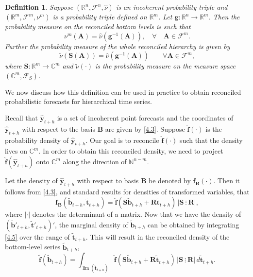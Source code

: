 \documentclass[a4paper, 11pt]{article}
\newtheorem{definition}{Definition}[section]
\begin{document}
\begin{definition} \label{def:reconprob}
  Suppose $(\mathbb{R}^n, \mathscr{F}^n, \hat{\nu})$ is an incoherent probability triple and $(\mathbb{R}^m, \mathscr{F}^m, \nu^m)$ is a probability triple defined on $\mathbb{R}^m$. Let $\bm{g}:\mathbb{R}^n \rightarrow \mathbb{R}^m $. Then the probability measure on the reconciled bottom levels is such that
  \begin{equation}
  \nu^m(\bm{A}) = \hat{\nu}(\bm{g}^{-1}(\bm{A})), \quad \forall \quad \bm{A} \in \mathscr{F}^m.
  \end{equation}
  Further the probability measure of the whole reconciled hierarchy is given by
  \begin{equation}
  \tilde{\nu}(\bm{S}(\bm{A})) = \hat{\nu}(\bm{g}^{-1}(\bm{A})) \qquad \forall \bm{A} \in \mathscr{F}^m,
  \end{equation}
  where $\bm{S}:\mathbb{R}^m \rightarrow \mathbb{C}^m$ and $\tilde{\nu}(\cdot)$ is the probability measure on the measure space $(\mathbb{C}^m, \mathscr{F}_S)$.
\end{definition}

We now discuss how this definition can be used in practice to obtain reconciled probabilistic forecasts for hierarchical time series.

Recall that $\hat{\bm{y}}_{t+h}$ is a set of incoherent point forecasts and the coordinates of $\hat{\bm{y}}_{t+h}$ with respect to the basis $\bm{B}$ are given by \eqref{4.3}. Suppose $\hat{\bm{f}}(\cdot)$ is the probability density of $\hat{\bm{y}}_{t+h}$. Our goal is to reconcile $\hat{\bm{f}}(\cdot)$ such that the density lives on $\mathbb{C}^m$. In order to obtain this reconciled density, we need to project $\hat{\bm{f}}(\hat{\bm{y}}_{t+h})$ onto $\mathbb{C}^m$ along the direction of $\mathbb{N}^{n-m}$.

Let the density of $\hat{\bm{y}}_{t+h}$ with respect to basis $\bm{B}$ be denoted by $\bm{f_B}(\cdot)$. Then it follows from  \eqref{4.3}, and standard results for densities of transformed variables, that
\begin{equation}\label{4.5}
\bm{f_B}(\tilde{\bm{b}}_{t+h},\tilde{\bm{t}}_{t+h})=\hat{\bm{f}}(\bm{S}\tilde{\bm{b}}_{t+h}+\bm{R}\tilde{\bm{t}}_{t+h}) \,\Big|\bm{S} ~ \vdots~ \bm{R}\Big|,
\end{equation}
where $|\cdot|$ denotes the determinant of a matrix. Now that we have the density of $(\tilde{\bm{b}}'_{t+h} , \tilde{\bm{t}}'_{t+h})'$, the marginal density of $\tilde{\bm{b}}_{t+h}$ can be obtained by integrating \eqref{4.5} over the range of $\tilde{\bm{t}}_{t+h}$. This will result in the reconciled density of the bottom-level series $\tilde{\bm{b}}_{t+h}$,
\begin{equation}\label{4.6}
\tilde{\bm{f}}(\tilde{\bm{b}}_{t+h})=\int_{\lim(\tilde{\bm{t}}_{t+h})}\hat{\bm{f}}(\bm{S}\tilde{\bm{b}}_{t+h}+\bm{R}\tilde{\bm{t}}_{t+h})\,  \Big|\bm{S} ~ \vdots~ \bm{R}\Big| \, d\tilde{\bm{t}}_{t+h}.
\end{equation}
\end{document}
